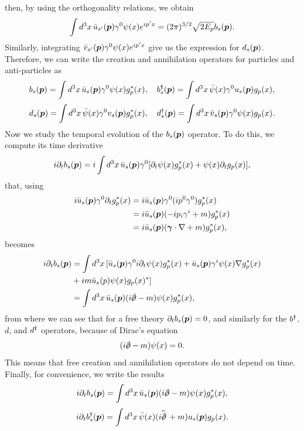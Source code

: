 then, by using the orthogonality relations, we obtain 
\begin{equation}
       \int d^3x\,\bar{u}_{s'}(\bm{p})\gamma^0\psi(x)e^{ip'x} = (2\pi)^{3/2}\sqrt{2E_p}b_s(\bm{p}).
\end{equation}
Similarly, integrating $\bar{v}_{s'}(\bm{p})\gamma^0\psi(x)e^{ip'x}$ give us the expression for $d_s(\bm{p})$. Therefore, we can write the creation and annihilation operators for particles and anti-particles as 
\begin{equation}
    b_s(\bm{p}) = \int d^3x\,\bar{u}_s(\bm{p})\gamma^0\psi(x)g_p^*(x),\quad b^\dagger_s(\bm{p}) = \int d^3x\,\bar{\psi}(x)\gamma^0u_s(\bm{p})g_p(x),
\end{equation}
\begin{equation}
    d_s(\bm{p}) = \int d^3x\,\bar{\psi}(x)\gamma^0v_s(\bm{p})g_p^*(x),\quad d^\dagger_s(\bm{p}) = \int d^3x\,\bar{v}_s(\bm{p})\gamma^0\psi(x)g_p(x).
\end{equation}
Now we study the temporal evolution of the $b_s(\bm{p})$ operator. To do this, we compute its time derivative 
\begin{equation}
    i\partial_tb_s(\bm{p}) = i\int d^3x\,\bar{u}_s(\bm{p})\gamma^0[\partial_t\psi(x)g_p^*(x) + \psi(x)\partial_tg_p(x)],
\end{equation}
that, using
\begin{equation}
    \begin{split}
        i\bar{u}_s(\bm{p})\gamma^0 \partial_tg_p^*(x) &= i\bar{u}_s(\bm{p})\gamma^0 (ip^0\gamma^0)g_p^*(x) \\
        &=i\bar{u}_s(\bm{p})(-ip_i\gamma^i + m)g_p^*(x) \\
        &= i\bar{u}_s(\bm{p})(\bm{\gamma}\cdot \nabla + m)g_p^*(x),
    \end{split}
\end{equation}
becomes 
\begin{equation}
    \begin{split}
        i\p_tb_s(\v{p}) &= \int d^3x\,[\b{u}_s(\v{p})\gamma^0i\p_t\psi(x)g_p^*(x) + \b{u}_s(\v{p})\gamma^i\psi(x)\nabla g_p^*(x) \\
        &+ im\b{u}_s(p)\psi(x)g_p(x)^*] \\
        &= \int d^3x\,\b{u}_s(\v{p})(i\sl{\p} - m)\psi(x)g_p^*(x),
    \end{split}
\end{equation}
from where we can see that for a free theory $\partial_tb_s(\bm{p}) = 0$, and similarly for the $b^\dagger$, $d$, and $d^\dagger$ operators, because of Dirac's equation 
\begin{equation}
    (i\sl{\p} - m)\psi(x) = 0.
\end{equation}
This means that free creation and annihilation operators do not depend on time. Finally, for convenience, we write the results
\begin{equation}
        i\p_tb_s(\v{p}) = \int d^3x\,\b{u}_s(\v{p})(i\sl{\p} - m)\psi(x)g_p^*(x),
\end{equation}
\begin{equation}
        i\p_tb_s^\dg(\v{p}) = \int d^3x\,\b{\psi}(x)(i\backv{\sl{\p}} + m)u_s(\v{p})g_p(x).
\end{equation}

